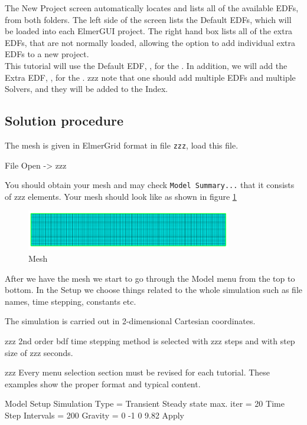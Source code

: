 The New Project screen automatically locates and lists all of the available EDFs, from both folders.  The left side of the screen lists the Default EDFs, which will be loaded into each ElmerGUI project.  The right hand box lists all of the extra EDFs, that are not normally loaded, allowing the option to add individual extra EDFs to a new project.\\

This tutorial will use the Default EDF, \texttt{}, for the .  In addition, we will add the Extra EDF,  \texttt{}, for the .   zzz note that one should add multiple EDFs and multiple Solvers, and they will be added to the Index.

\subsection*{Solution procedure}

The mesh is given in ElmerGrid format in file \texttt{zzz}, load this file.

\ttbegin
File 
  Open -> zzz
\ttend

You should obtain your mesh and may check \texttt{Model Summary...} that it consists of zzz elements.  Your mesh should look like as shown in figure \ref{fg:mesh}

\begin{figure}[H]
\centering
\includegraphics[width=0.8\textwidth]{mesh}
\caption{Mesh}\label{fg:mesh}
\end{figure}

After we have the mesh we start to go through the Model menu from the top to bottom.  In the Setup we choose things related to the whole simulation such as file names, time stepping, constants etc.  

The simulation is carried out in 2-dimensional Cartesian coordinates.

zzz 2nd order bdf time stepping method is selected with zzz steps and with step size of zzz seconds.

zzz Every menu selection section must be revised for each tutorial.  These examples show the proper format and typical content.

\ttbegin
Model
  Setup 
    Simulation Type = Transient
    Steady state max. iter = 20
    Time Step Intervals = 200
    Gravity = 0 -1 0 9.82
  Apply
\ttend

